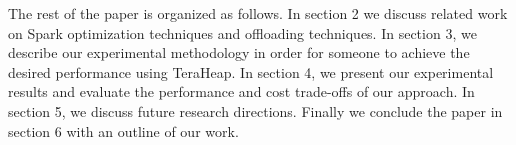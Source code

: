 The rest of the paper is organized as follows. In section 2 we discuss
related work on Spark optimization techniques and offloading
techniques. In section 3, we describe our experimental methodology in
order for someone to achieve the desired performance using TeraHeap.
In section 4, we present our experimental results and evaluate the
performance and cost trade-offs of our approach. In section 5, we
discuss future research directions. Finally we conclude the paper in
section 6 with an outline of our work.

